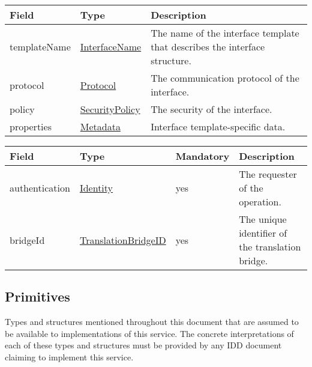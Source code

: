 \documentclass[a4paper]{arrowhead}
\newcommand{\pref}[1]{{\textcolor{ArrowheadGrey}{\hyperref[sec:model:primitives:#1]{#1}}}}
\begin{document}

\begin{table}[ht!]
\begin{tabularx}{\textwidth}{| p{3.9cm} | p{4cm} | X |} \hline
\rowcolor{gray!33} Field & Type & Description \\ \hline
templateName & \pref{InterfaceName} & The name of the interface template that describes the interface structure. \\ \hline
protocol & \pref{Protocol} & The communication protocol of the interface. \\ \hline
policy & \pref{SecurityPolicy} & The security of the interface. \\ \hline
properties &\hyperref[sec:model:Metadata]{Metadata} & Interface template-specific data. \\ \hline
\end{tabularx}
\end{table}

 
\begin{table}[ht!]
\begin{tabularx}{\textwidth}{| p{3.9cm} | p{5.5cm} | p{2cm} | X |} \hline
\rowcolor{gray!33} Field & Type & Mandatory & Description \\ \hline
authentication & \hyperref[sec:model:Identity]{Identity} & yes & The requester of the operation. \\ \hline
bridgeId & \pref{TranslationBridgeID} & yes & The unique identifier of the translation bridge. \\ \hline
\end{tabularx}
\end{table}

\subsection{Primitives}
\label{sec:model:primitives}

Types and structures mentioned throughout this document that are assumed to be available to implementations of this service.
The concrete interpretations of each of these types and structures must be provided by any IDD document claiming to implement this service.
\end{document}
